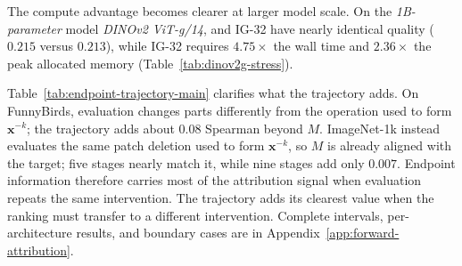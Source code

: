The compute advantage becomes clearer at larger model scale. On the \emph{1B-parameter} model
\emph{DINOv2 ViT-g/14},  and IG-32 have nearly identical quality
($0.215$ versus $0.213$), while IG-32 requires $4.75\times$ the wall time and
$2.36\times$ the peak allocated memory
(Table~\ref{tab:dinov2g-stress}).

Table~\ref{tab:endpoint-trajectory-main} clarifies what the trajectory adds.
On FunnyBirds, evaluation changes parts differently from the operation used
to form $\mathbf{x}^{-k}$; the trajectory adds about $0.08$ Spearman beyond
$M$. ImageNet-1k instead evaluates the same patch deletion used to form
$\mathbf{x}^{-k}$, so $M$ is already aligned with the target; five stages
nearly match it, while nine stages add only $0.007$. Endpoint information therefore
carries most of the attribution signal when evaluation repeats the same
intervention. The trajectory adds its clearest value when the ranking must
transfer to a different intervention. Complete intervals, per-architecture
results, and boundary cases are in Appendix~\ref{app:forward-attribution}.





